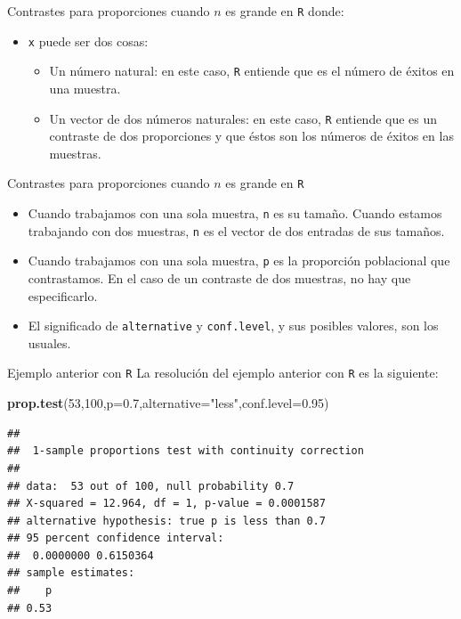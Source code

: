 \documentclass[
  ignorenonframetext,
]{beamer}
\newenvironment{Shaded}{\begin{snugshade}}{\end{snugshade}}
\newcommand{\DataTypeTok}[1]{\textcolor[rgb]{0.13,0.29,0.53}{#1}}
\newcommand{\DecValTok}[1]{\textcolor[rgb]{0.00,0.00,0.81}{#1}}
\newcommand{\FloatTok}[1]{\textcolor[rgb]{0.00,0.00,0.81}{#1}}
\newcommand{\KeywordTok}[1]{\textcolor[rgb]{0.13,0.29,0.53}{\textbf{#1}}}
\newcommand{\NormalTok}[1]{#1}
\newcommand{\StringTok}[1]{\textcolor[rgb]{0.31,0.60,0.02}{#1}}
\providecommand{\tightlist}{%
  \setlength{\itemsep}{0pt}\setlength{\parskip}{0pt}}
\begin{document}
\begin{frame}[fragile]{Contrastes para proporciones cuando \(n\) es
grande en \texttt{R}}
\protect\hypertarget{contrastes-para-proporciones-cuando-n-es-grande-en-r-1}{}
donde:

\begin{itemize}[<+->]
\item
  \texttt{x} puede ser dos cosas:

  \begin{itemize}[<+->]
  \tightlist
  \item
    Un número natural: en este caso, \texttt{R} entiende que es el
    número de éxitos en una muestra.
  \item
    Un vector de dos números naturales: en este caso, \texttt{R}
    entiende que es un contraste de dos proporciones y que éstos son los
    números de éxitos en las muestras.
  \end{itemize}
\end{itemize}
\end{frame}

\begin{frame}[fragile]{Contrastes para proporciones cuando \(n\) es
grande en \texttt{R}}
\protect\hypertarget{contrastes-para-proporciones-cuando-n-es-grande-en-r-2}{}
\begin{itemize}[<+->]
\item
  Cuando trabajamos con una sola muestra, \texttt{n} es su tamaño.
  Cuando estamos trabajando con dos muestras, \texttt{n} es el vector de
  dos entradas de sus tamaños.
\item
  Cuando trabajamos con una sola muestra, \texttt{p} es la proporción
  poblacional que contrastamos. En el caso de un contraste de dos
  muestras, no hay que especificarlo.
\item
  El significado de \texttt{alternative} y \texttt{conf.level}, y sus
  posibles valores, son los usuales.
\end{itemize}
\end{frame}

\begin{frame}[fragile]{Ejemplo anterior con \texttt{R}}
\protect\hypertarget{ejemplo-anterior-con-r}{}
La resolución del ejemplo anterior con \texttt{R} es la siguiente:

\begin{Shaded}
\begin{Highlighting}[]
\KeywordTok{prop.test}\NormalTok{(}\DecValTok{53}\NormalTok{,}\DecValTok{100}\NormalTok{,}\DataTypeTok{p=}\FloatTok{0.7}\NormalTok{,}\DataTypeTok{alternative=}\StringTok{"less"}\NormalTok{,}\DataTypeTok{conf.level=}\FloatTok{0.95}\NormalTok{)}
\end{Highlighting}
\end{Shaded}

\begin{verbatim}
## 
##  1-sample proportions test with continuity correction
## 
## data:  53 out of 100, null probability 0.7
## X-squared = 12.964, df = 1, p-value = 0.0001587
## alternative hypothesis: true p is less than 0.7
## 95 percent confidence interval:
##  0.0000000 0.6150364
## sample estimates:
##    p 
## 0.53
\end{verbatim}
\end{frame}
\end{document}

